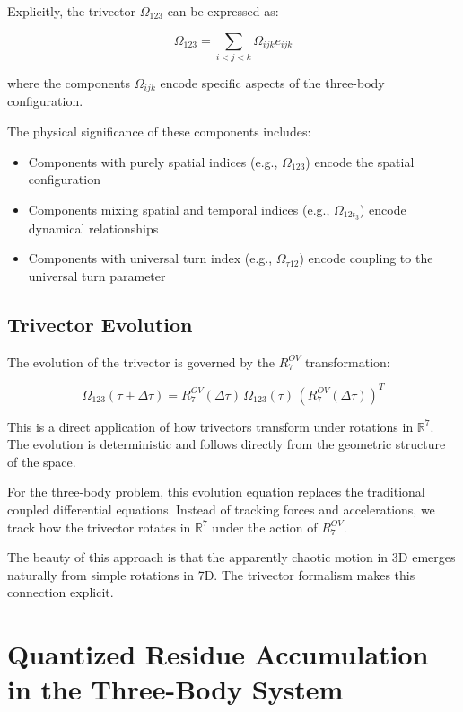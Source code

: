 \documentclass{article}
\begin{document}
Explicitly, the trivector $\Omega_{123}$ can be expressed as:

\begin{equation}
\Omega_{123} = \sum_{i<j<k} \Omega_{ijk} e_{ijk}
\end{equation}

where the components $\Omega_{ijk}$ encode specific aspects of the three-body configuration.

The physical significance of these components includes:
\begin{itemize}
\item Components with purely spatial indices (e.g., $\Omega_{123}$) encode the spatial configuration
\item Components mixing spatial and temporal indices (e.g., $\Omega_{12t_3}$) encode dynamical relationships
\item Components with universal turn index (e.g., $\Omega_{\tau 12}$) encode coupling to the universal turn parameter
\end{itemize}

\subsection{Trivector Evolution}

The evolution of the trivector is governed by the $R^{OV}_7$ transformation:

\begin{equation}
\Omega_{123}(\tau+\Delta\tau) = R^{OV}_7(\Delta\tau) \, \Omega_{123}(\tau) \, (R^{OV}_7(\Delta\tau))^T
\end{equation}

This is a direct application of how trivectors transform under rotations in $\mathbb{R}^7$. The evolution is deterministic and follows directly from the geometric structure of the space.

For the three-body problem, this evolution equation replaces the traditional coupled differential equations. Instead of tracking forces and accelerations, we track how the trivector rotates in $\mathbb{R}^7$ under the action of $R^{OV}_7$.

The beauty of this approach is that the apparently chaotic motion in 3D emerges naturally from simple rotations in 7D. The trivector formalism makes this connection explicit.

\section{Quantized Residue Accumulation in the Three-Body System}
\end{document}
